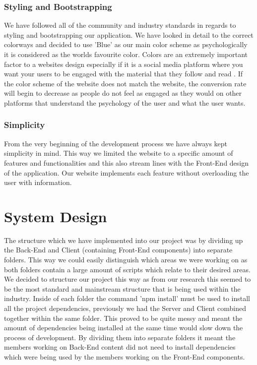 \subsection{Styling and Bootstrapping}
We have followed all of the community and industry standards in regards to styling and bootstrapping our application. We have looked in detail to the correct colorways and decided to use 'Blue' as our main color scheme as psychologically it is considered as the worlds favourite color. Colors are an extremely important factor to a websites design especially if it is a social media platform where you want your users to be engaged with the material that they follow and read \cite{singh2011impact}. If the color scheme of the website does not match the website, the conversion rate will begin to decrease as people do not feel as engaged as they would on other platforms that understand the psychology of the user and what the user wants.

\subsection{Simplicity}
From the very beginning of the development process we have always kept simplicity in mind. This way we limited the website to a specific amount of features and functionalities and this also stream lines with the Front-End design of the application. Our website implements each feature without overloading the user with information.


\chapter{System Design}

The structure which we have implemented into our project was by dividing up the Back-End and Client (containing Front-End components) into separate folders. This way we could easily distinguish which areas we were working on as both folders contain a large amount of scripts which relate to their desired areas. We decided to structure our project this way as from our research this seemed to be the most standard and mainstream structure that is being used within the industry. Inside of each folder the command 'npm install' must be used to install all the project dependencies, previously we had the Server and Client combined together within the same folder. This proved to be quite messy and meant the amount of dependencies being installed at the same time would slow down the process of development. By dividing them into separate folders it meant the members working on Back-End content did not need to install dependencies which were being used by the members working on the Front-End components.

